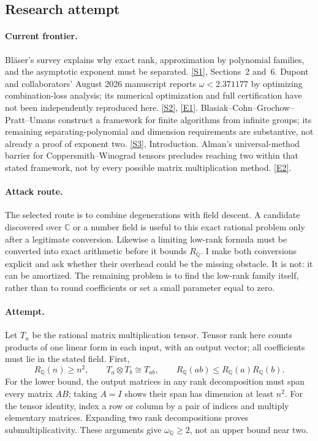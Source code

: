 \documentclass[11pt,a4paper]{article}
\newcommand{\Q}{\mathbb{Q}}
\newcommand{\C}{\mathbb{C}}
\newcommand{\sref}[2]{\hyperlink{source:#1:#2}{[S#2]}}
\newcommand{\eref}[2]{\hyperlink{extra:#1:#2}{[E#2]}}
\numberwithin{equation}{section}
\begin{document}
\subsection{Research attempt}

\paragraph{Current frontier.}
Bl\"aser's survey explains why exact rank, approximation by polynomial
families, and the asymptotic exponent must be separated. \sref{3100086}{1},
Sections~2 and~6. Dupont and collaborators' August 2026 manuscript reports
$\omega<2.371177$ by optimizing combination-loss analysis; its numerical
optimization and full certification have not been independently reproduced
here. \sref{3100086}{2}, \eref{3100086}{1}. Blasiak--Cohn--Grochow--Pratt--Umans
construct a framework for finite algorithms from infinite groups; its
remaining separating-polynomial and dimension requirements are substantive,
not already a proof of exponent two. \sref{3100086}{3}, Introduction.
Alman's universal-method barrier for Coppersmith--Winograd tensors
precludes reaching two within that stated framework, not by every possible
matrix multiplication method. \eref{3100086}{2}.

\paragraph{Attack route.}
The selected route is to combine degenerations with field descent. A
candidate discovered over $\C$ or a number field is useful to this exact
rational problem only after a legitimate conversion. Likewise a limiting
low-rank formula must be converted into exact arithmetic before it bounds
$R_{\Q}$. I make both conversions explicit and ask whether their overhead
could be the missing obstacle. It is not: it can be amortized. The remaining
problem is to find the low-rank family itself, rather than to round
coefficients or set a small parameter equal to zero.

\paragraph{Attempt.}
Let $T_n$ be the rational matrix multiplication tensor. Tensor rank here
counts products of one linear form in each input, with an output vector;
all coefficients must lie in the stated field. First,
\begin{equation}\label{r26:basic}
 R_{\Q}(n)\ge n^2,\qquad T_a\otimes T_b\cong T_{ab},
 \qquad R_{\Q}(ab)\le R_{\Q}(a)R_{\Q}(b).
\end{equation}
For the lower bound, the output matrices in any rank decomposition must
span every matrix $AB$; taking $A=I$ shows their span has dimension at
least $n^2$. For the tensor identity, index a row or column by a pair
of indices and multiply elementary matrices. Expanding two rank
decompositions proves submultiplicativity. These arguments give
$\omega_{\Q}\ge2$, not an upper bound near two.
\end{document}
